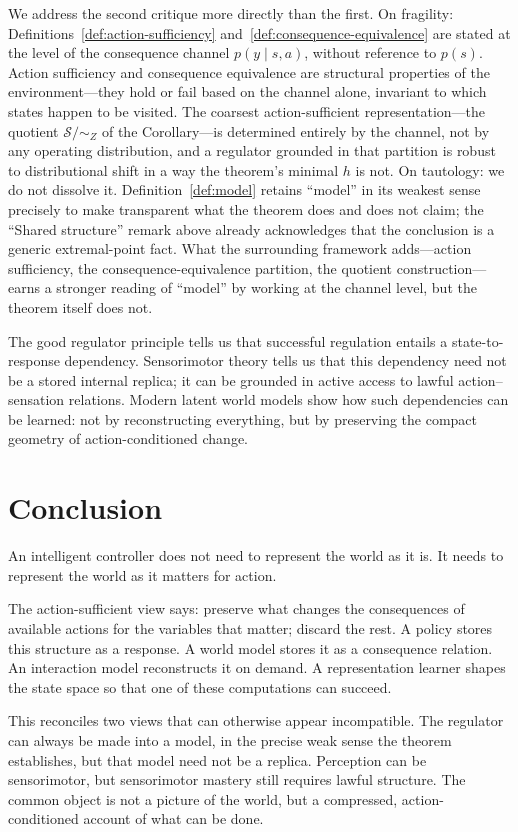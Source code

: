 \documentclass[11pt]{article}
\theoremstyle{remark}
\newcommand{\Scal}{\mathcal S}
\newcommand{\1}{\mathbb 1}
\begin{document}
We address the second critique more directly than the first. On fragility: Definitions~\ref{def:action-sufficiency} and~\ref{def:consequence-equivalence} are stated at the level of the consequence channel $p(y\mid s,a)$, without reference to $p(s)$. Action sufficiency and consequence equivalence are structural properties of the environment---they hold or fail based on the channel alone, invariant to which states happen to be visited. The coarsest action-sufficient representation---the quotient $\Scal/{\sim_Z}$ of the Corollary---is determined entirely by the channel, not by any operating distribution, and a regulator grounded in that partition is robust to distributional shift in a way the theorem's minimal $h$ is not. On tautology: we do not dissolve it. Definition~\ref{def:model} retains ``model'' in its weakest sense precisely to make transparent what the theorem does and does not claim; the ``Shared structure'' remark above already acknowledges that the conclusion is a generic extremal-point fact. What the surrounding framework adds---action sufficiency, the consequence-equivalence partition, the quotient construction---earns a stronger reading of ``model'' by working at the channel level, but the theorem itself does not.

The good regulator principle tells us that successful regulation entails a state-to-response dependency. Sensorimotor theory tells us that this dependency need not be a stored internal replica; it can be grounded in active access to lawful action--sensation relations. Modern latent world models show how such dependencies can be learned: not by reconstructing everything, but by preserving the compact geometry of action-conditioned change.

\section{Conclusion}

An intelligent controller does not need to represent the world as it is. It needs to represent the world as it matters for action.

The action-sufficient view says: preserve what changes the consequences of available actions for the variables that matter; discard the rest. A policy stores this structure as a response. A world model stores it as a consequence relation. An interaction model reconstructs it on demand. A representation learner shapes the state space so that one of these computations can succeed.

This reconciles two views that can otherwise appear incompatible. The regulator can always be made into a model, in the precise weak sense the theorem establishes, but that model need not be a replica. Perception can be sensorimotor, but sensorimotor mastery still requires lawful structure. The common object is not a picture of the world, but a compressed, action-conditioned account of what can be done.



\end{document}
